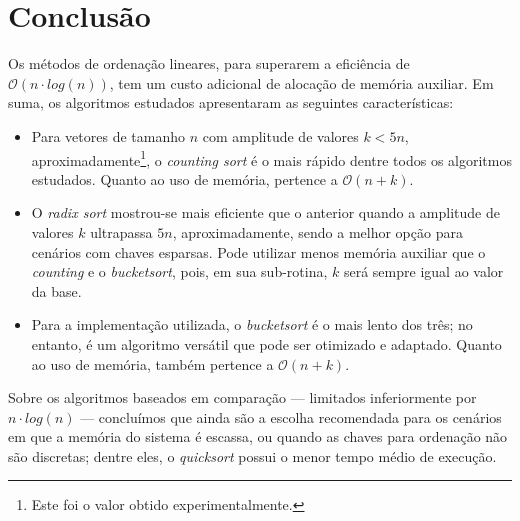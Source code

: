 \documentclass[fontsize=10pt]{article}
\begin{document}
\section{Conclusão}
    
\quad Os métodos de ordenação lineares, para superarem a eficiência de $\mathcal{O}(n \cdot log(n))$, tem um custo adicional de alocação de memória auxiliar. Em suma, os algoritmos estudados apresentaram as seguintes características:

\begin{itemize}
    \item Para vetores de tamanho $n$ com amplitude de valores $k < 5n$, aproximadamente\footnote{Este foi o valor obtido experimentalmente.}, o \textit{counting sort} é o mais rápido dentre todos os algoritmos estudados. Quanto ao uso de memória, pertence a $\mathcal{O}(n + k)$.
    
    \item O \textit{radix sort} mostrou-se mais eficiente que o anterior quando a amplitude de valores $k$ ultrapassa $5n$, aproximadamente, sendo a melhor opção para cenários com chaves esparsas. Pode utilizar menos memória auxiliar que o \textit{counting} e o \textit{bucketsort}, pois, em sua sub-rotina, $k$ será sempre igual ao valor da base.
    
    \item Para a implementação utilizada, o \textit{bucketsort} é o mais lento dos três; no entanto, é um algoritmo versátil que pode ser otimizado e adaptado. Quanto ao uso de memória, também pertence a $\mathcal{O}(n + k)$.
\end{itemize}

\quad Sobre os algoritmos baseados em comparação — limitados inferiormente por $n \cdot log(n)$ — concluímos que ainda são a escolha recomendada para os cenários em que a memória do sistema é escassa, ou quando as chaves para ordenação não são discretas; dentre eles, o \textit{quicksort} possui o menor tempo médio de execução.

\nocite{*}


\end{document}
